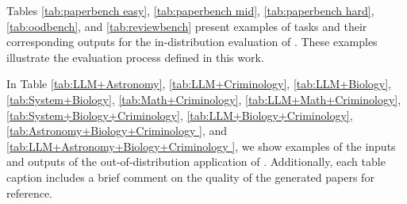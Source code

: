 Tables \ref{tab:paperbench easy}, \ref{tab:paperbench mid}, \ref{tab:paperbench hard}, \ref{tab:oodbench}, and \ref{tab:reviewbench} present examples of tasks and their corresponding outputs for the in-distribution evaluation of \envname. These examples illustrate the evaluation process defined in this work.

\label{more-example}
In Table \ref{tab:LLM+Astronomy}, \ref{tab:LLM+Criminology}, \ref{tab:LLM+Biology}, \ref{tab:System+Biology}, \ref{tab:Math+Criminology}, \ref{tab:LLM+Math+Criminology}, \ref{tab:System+Biology+Criminology}, \ref{tab:LLM+Biology+Criminology}, \ref{tab:Astronomy+Biology+Criminology }, and \ref{tab:LLM+Astronomy+Biology+Criminology }, we show examples of the inputs and outputs of the out-of-distribution application of \envname. Additionally, each table caption includes a brief comment on the quality of the generated papers for reference.




\newpage




